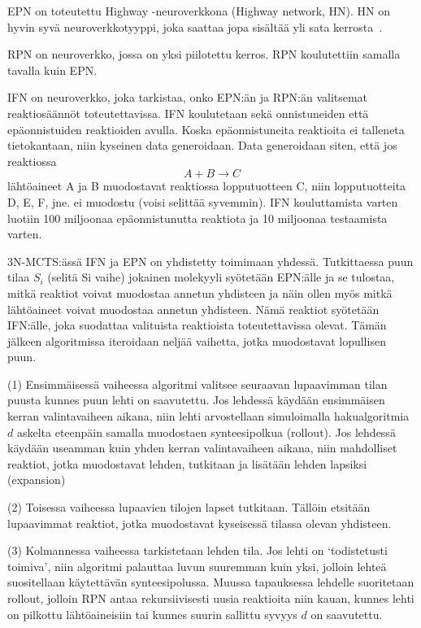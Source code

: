 \documentclass[finnish,twoside,censored,tkt,sw-line]{HYthesisML}
\begin{document}
EPN on toteutettu Highway -neuroverkkona (Highway network, HN).
HN on hyvin syvä neuroverkkotyyppi, joka saattaa jopa sisältää yli sata kerrosta~\cite{VeryDeepNetworks}.

RPN on neuroverkko, jossa on yksi piilotettu kerros. RPN koulutettiin samalla tavalla kuin EPN.

IFN on neuroverkko, joka tarkistaa, onko EPN:än ja RPN:än valitsemat reaktiosäännöt toteutettavissa.
IFN koulutetaan sekä onnistuneiden että epäonnistuiden reaktioiden avulla. Koska epäonnistuneita
reaktioita ei talleneta tietokantaan, niin kyseinen data generoidaan. Data generoidaan siten, että jos reaktiossa
\[A + B \rightarrow C\] lähtöaineet A ja B muodostavat reaktiossa lopputuotteen C, niin lopputuotteita
D, E, F, jne. ei muodostu (voisi selittää syvemmin). IFN kouluttamista varten luotiin 100 miljoonaa
epäonnistunutta reaktiota ja 10 miljoonaa testaamista varten.

3N-MCTS:ässä IFN ja EPN on yhdistetty toimimaan yhdessä. Tutkittaessa puun tilaa $S_i$ (selitä Si vaihe) jokainen
molekyyli syötetään EPN:älle ja se tulostaa, mitkä reaktiot voivat muodostaa annetun yhdisteen ja näin ollen
myös mitkä lähtöaineet voivat muodostaa annetun yhdisteen. Nämä reaktiot syötetään IFN:älle, joka suodattaa
valituista reaktioista toteutettavissa olevat. Tämän jälkeen algoritmissa iteroidaan neljää vaihetta, jotka
muodostavat lopullisen puun.

(1) Ensimmäisessä vaiheessa algoritmi valitsee seuraavan lupaavimman tilan puusta kunnes puun lehti on saavutettu.
Jos lehdessä käydään ensimmäisen kerran valintavaiheen aikana, niin lehti arvostellaan simuloimalla hakualgoritmia
$d$ askelta eteenpäin samalla muodostaen synteesipolkua (rollout). Jos lehdessä käydään useamman kuin yhden
kerran valintavaiheen aikana, niin mahdolliset reaktiot, jotka muodostavat lehden, tutkitaan ja lisätään lehden
lapsiksi (expansion)

(2) Toisessa vaiheessa lupaavien tilojen lapset tutkitaan. Tällöin etsitään lupaavimmat reaktiot, jotka muodostavat
kyseisessä tilassa olevan yhdisteen.

(3) Kolmannessa vaiheessa tarkistetaan lehden tila. Jos lehti on `todistetusti toimiva', niin algoritmi palauttaa
luvun suuremman kuin yksi, jolloin lehteä suositellaan käytettävän synteesipolussa. Muussa tapauksessa lehdelle
suoritetaan rollout, jolloin RPN antaa rekursiivisesti uusia reaktioita niin kauan, kunnes lehti on pilkottu
lähtöaineisiin tai kunnes suurin sallittu syvyys $d$ on saavutettu.
\end{document}
